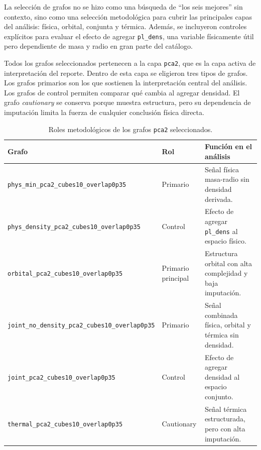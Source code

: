 La selección de grafos no se hizo como una búsqueda de ``los seis mejores'' sin contexto, sino como una selección metodológica para cubrir las principales capas del análisis: física, orbital, conjunta y térmica. Además, se incluyeron controles explícitos para evaluar el efecto de agregar \texttt{pl\_dens}, una variable físicamente útil pero dependiente de masa y radio en gran parte del catálogo.

Todos los grafos seleccionados pertenecen a la capa \texttt{pca2}, que es la capa activa de interpretación del reporte. Dentro de esta capa se eligieron tres tipos de grafos. Los grafos primarios son los que sostienen la interpretación central del análisis. Los grafos de control permiten comparar qué cambia al agregar densidad. El grafo \textit{cautionary} se conserva porque muestra estructura, pero su dependencia de imputación limita la fuerza de cualquier conclusión física directa.

\begin{table}[H]
\centering
\small
\begin{tabular}{p{}p{}p{}}
\toprule
\textbf{Grafo} & \textbf{Rol} & \textbf{Función en el análisis} \\
\midrule
\texttt{phys\_min\_pca2\_cubes10\_overlap0p35} 
& Primario 
& Señal física masa-radio sin densidad derivada. \\

\texttt{phys\_density\_pca2\_cubes10\_overlap0p35} 
& Control 
& Efecto de agregar \texttt{pl\_dens} al espacio físico. \\

\texttt{orbital\_pca2\_cubes10\_overlap0p35} 
& Primario principal 
& Estructura orbital con alta complejidad y baja imputación. \\

\texttt{joint\_no\_density\_pca2\_cubes10\_overlap0p35} 
& Primario 
& Señal combinada física, orbital y térmica sin densidad. \\

\texttt{joint\_pca2\_cubes10\_overlap0p35} 
& Control 
& Efecto de agregar densidad al espacio conjunto. \\

\texttt{thermal\_pca2\_cubes10\_overlap0p35} 
& Cautionary 
& Señal térmica estructurada, pero con alta imputación. \\
\bottomrule
\end{tabular}
\caption{Roles metodológicos de los grafos \texttt{pca2} seleccionados.}
\label{tab:selected_graph_roles}
\end{table}

